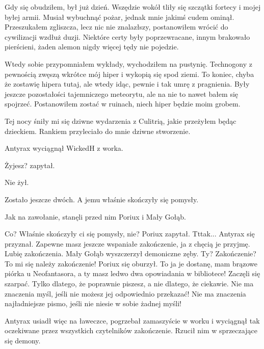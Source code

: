 Gdy się obudziłem, był już dzień. Wszędzie wokół tliły się szczątki fortecy i mojej byłej armii.
Musiał wybuchnąć pożar, jednak mnie jakimś cudem ominął.
Przeszukałem zgliszcza, lecz nic nie znalazłszy, postanowiłem wrócić do cywilizacji wzdłuż duzji. 
Niektóre certy były poprzewracane, innym brakowało pierścieni, żaden alemon nigdy więcej tędy nie pojedzie.

Wtedy sobie przypomniałem wykłady, wychodziłem na pustynię. Technogony z pewnością zwęszą wkrótce mój hiper i wykopią się spod ziemi.
To koniec, chyba że zostawię hipera tutaj, ale wtedy idąc, pewnie i tak umrę z pragnienia.
Były jeszcze pozostałości tajemniczego meteorytu, ale na nie to nawet bałem się spojrzeć.
Postanowiłem zostać w ruinach, niech hiper będzie moim grobem.

Tej nocy śniły mi się dziwne wydarzenia z Culitrią, jakie przeżyłem będąc dzieckiem.
Rankiem przyleciało do mnie dziwne stworzenie.

\divider{}

Antyrax wyciągnął WickedH z worka.
\begin{dialogue}
\ds{} Żyjesz? \dm{} zapytał. 
\end{dialogue}
Nie żył.

Zostało jeszcze dwóch.
A jemu właśnie skończyły się pomysły.

Jak na zawołanie, stanęli przed nim Poriux i Mały Gołąb.
\begin{dialogue}
\ds{} Co? Właśnie skończyły ci się pomysły, nie? \dm{} Poriux zapytał.
\ds{} Tttak... \dm{} Antyrax się przyznał.
\ds{} Zapewne masz jeszcze wspaniałe zakończenie, ja z chęcią je przyjmę. Lubię zakończenia. \dm{} Mały Gołąb wyszczerzył demoniczne zęby.
\ds{} Ty? Zakończenie? To mi się należy zakończenie! \dm{} Poriux się oburzył.
\ds{} To ja je dostanę, mam brązowe piórka u Neofantasora, a ty masz ledwo dwa opowiadania w bibliotece! \dm{} Zaczęli się szarpać.
\ds{} Tylko dlatego, że poprawnie piszesz, a nie dlatego, że ciekawie.
\ds{} Nie ma znaczenia myśl, jeśli nie możesz jej odpowiednio przekazać!
\ds{} Nie ma znaczenia najładniejsze pismo, jeśli nie niesie w sobie żadnej myśli!
\end{dialogue}

Antyrax usiadł więc na ławeczce, pogrzebał zamaszyście w worku i wyciągnął tak oczekiwane przez wszystkich czytelników zakończenie.
Rzucił nim w sprzeczające się demony.

\divider{}

